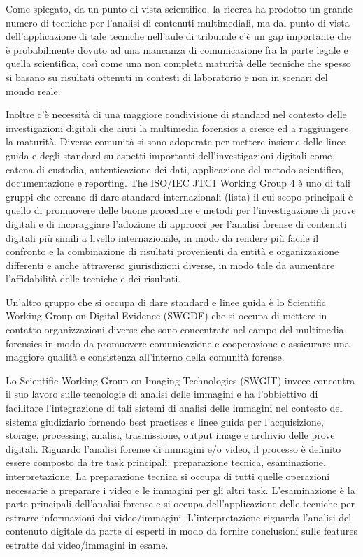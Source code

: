 Come spiegato, da un punto di vista scientifico, la ricerca ha prodotto un grande numero di tecniche per l'analisi di contenuti multimediali, ma dal punto di vista dell'applicazione di tale tecniche nell'aule di tribunale c'è un gap importante che è probabilmente dovuto ad una mancanza di comunicazione fra la parte legale e quella scientifica, così come una non completa maturità delle tecniche che spesso si basano su risultati ottenuti in contesti di laboratorio e non in scenari del mondo reale.

Inoltre c'è necessità di una maggiore condivisione di standard nel contesto delle investigazioni digitali che aiuti la multimedia forensics a cresce ed a raggiungere la maturità.
Diverse comunità si sono adoperate per mettere insieme delle linee guida e degli standard su aspetti importanti dell'investigazioni digitali come catena di custodia, autenticazione dei dati, applicazione del metodo scientifico, documentazione e reporting.
The ISO/IEC JTC1 Working Group 4 è uno di tali gruppi che cercano di dare standard internazionali (lista) il cui scopo principali è quello di promuovere delle buone procedure e metodi per l'investigazione di prove digitali e di incoraggiare l'adozione di approcci per l'analisi forense di contenuti digitali più simili a livello internazionale, in modo da rendere più facile il confronto e la combinazione di risultati provenienti da entità e organizzazione differenti e anche attraverso giurisdizioni diverse, in modo tale da aumentare l'affidabilità delle tecniche e dei risultati.

Un'altro gruppo che si occupa di dare standard e linee guida è lo Scientific Working Group on Digital Evidence (SWGDE) che si occupa di mettere in contatto organizzazioni diverse che sono concentrate nel campo del multimedia forensics in modo da promuovere comunicazione e cooperazione e assicurare una maggiore qualità e consistenza all'interno della comunità forense.

Lo Scientific Working Group on Imaging Technologies (SWGIT) invece concentra il suo lavoro sulle tecnologie di analisi delle immagini e ha l'obbiettivo di facilitare l'integrazione di tali sistemi di analisi delle immagini nel contesto del sistema giudiziario fornendo best practises e linee guida per l'acquisizione, storage, processing, analisi, trasmissione, output image e archivio delle prove digitali.
Riguardo l'analisi forense di immagini e/o video, il processo è definito essere composto da tre task principali: preparazione tecnica, esaminazione, interpretazione. La preparazione tecnica si occupa di tutti quelle operazioni necessarie a preparare i video e le immagini per gli altri task. L'esaminazione è la parte principali dell'analisi forense e si occupa dell'applicazione delle tecniche  per estrarre informazioni dai video/immagini. L'interpretazione riguarda l'analisi del contenuto digitale da parte di esperti in modo da fornire conclusioni sulle features estratte dai video/immagini in esame.

